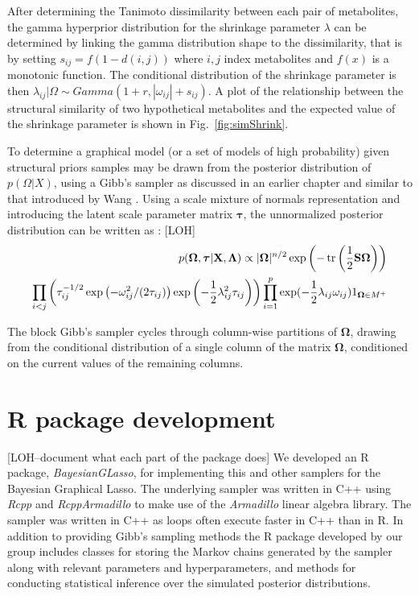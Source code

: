 \begin{DoubleSpace*}
After determining the Tanimoto dissimilarity between each pair of metabolites, the gamma hyperprior distribution for the shrinkage parameter $\lambda$ can be determined by linking the gamma distribution shape to the dissimilarity, that is by setting $s_{ij}=f(1-d(i,j))$ where $i,j$ index metabolites and $f(x)$ is a monotonic function. The conditional distribution of the shrinkage parameter is then $\lambda_{ij} |\Omega \sim Gamma(1+r,|\omega_{ij} |+s_{ij} )$. A plot of the relationship between the structural similarity of two hypothetical metabolites and the expected value of the shrinkage parameter is shown in  Fig.~\ref{fig:simShrink}. 

To determine a graphical model (or a set of models of high probability) given structural priors samples may be drawn from the posterior distribution of $p(\Omega|X)$, using a Gibb’s sampler as discussed in an earlier chapter and similar to that introduced by Wang \cite{wang2012}. Using a scale mixture of normals representation  \cite{west1987} and introducing the latent scale parameter matrix $\boldsymbol{\tau}$, the unnormalized posterior distribution can be written as \cite{wang2012}: [LOH]
\begin{align}
\begin{split}
	p(\boldsymbol{\Omega}, \boldsymbol{\tau}|\textbf{X}, \boldsymbol{\Lambda}) \propto |\boldsymbol{\Omega}| ^{n/2} \exp \left(-\operatorname{tr} \left(\frac{1}{2}\textbf{S}\boldsymbol{\Omega} \right) \right)\\ \prod_{i<j} \left(\tau_{ij}^{-1/2} \exp \left(-\omega_{ij}^2 / (2\tau_{ij}) \right) \exp \left(-\frac{1}{2} \lambda_{ij}^2 \tau_{ij}\right)\right)  \prod_{i=1}^{p} \exp(-\frac{1}{2} \lambda_{ij} \omega_{ij}) 1_{\boldsymbol{\Omega}\in M^+}
\end{split}
\end{align}

The block Gibb’s sampler cycles through column-wise partitions of $\boldsymbol{\Omega}$, drawing from the conditional distribution of a single column of the matrix $\boldsymbol{\Omega}$, conditioned on the current values of the remaining columns.

\section{R package development} [LOH--document what each part of the package does]
 We developed an R package, \emph{BayesianGLasso}, for implementing this and other samplers for the Bayesian Graphical Lasso. The underlying sampler was written in C++ using \emph{Rcpp} \cite{eddelbuettel2011,eddelbuettel2013} and \emph{RcppArmadillo} \cite{eddelbuettel2014} to make use of the \emph{Armadillo} \cite{sanderson2016} linear algebra library. The sampler was written in C++ as loops often execute faster in C++ than in R. In addition to providing Gibb’s sampling methods the R package developed by our group includes classes for storing the Markov chains generated by the sampler along with relevant parameters and hyperparameters, and methods for conducting statistical inference over the simulated posterior distributions.
 

\end{DoubleSpace*}
